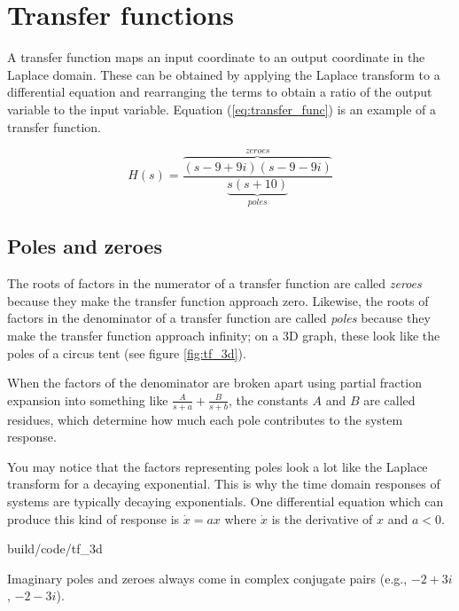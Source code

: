 \section{Transfer functions}

A transfer function maps an input coordinate to an output coordinate in the
Laplace domain. These can be obtained by applying the Laplace transform to a
differential equation and rearranging the terms to obtain a ratio of the output
variable to the input variable. Equation (\ref{eq:transfer_func}) is an example
of a transfer function.

\begin{equation} \label{eq:transfer_func}
  H(s) = \frac{\overbrace{(s-9+9i)(s-9-9i)}^{zeroes}}
    {\underbrace{s(s+10)}_{poles}}
\end{equation}

\subsection{Poles and zeroes}
\label{subsec:poles_and_zeroes}

The roots of factors in the numerator of a transfer function are called
\textit{zeroes} because they make the transfer function approach zero. Likewise,
the roots of factors in the denominator of a transfer function are called
\textit{poles} because they make the transfer function approach infinity; on a
3D graph, these look like the poles of a circus tent (see figure
\ref{fig:tf_3d}).

When the factors of the denominator are broken apart using partial fraction
expansion into something like $\frac{A}{s + a} + \frac{B}{s + b}$, the constants
$A$ and $B$ are called residues, which determine how much each pole contributes
to the \gls{system response}.

You may notice that the factors representing poles look a lot like the Laplace
transform for a decaying exponential. This is why the time domain responses of
\glspl{system} are typically decaying exponentials. One differential equation
which can produce this kind of response is $\dot{x} = ax$ where $\dot{x}$ is the
derivative of $x$ and $a < 0$.

\begin{svg}{build/code/tf_3d}
  \caption{Equation \ref{eq:transfer_func} plotted in 3D}
  \label{fig:tf_3d}
\end{svg}

\begin{remark}
  Imaginary poles and zeroes always come in complex conjugate pairs (e.g.,
  $-2 + 3i$, $-2 - 3i$).
\end{remark}

